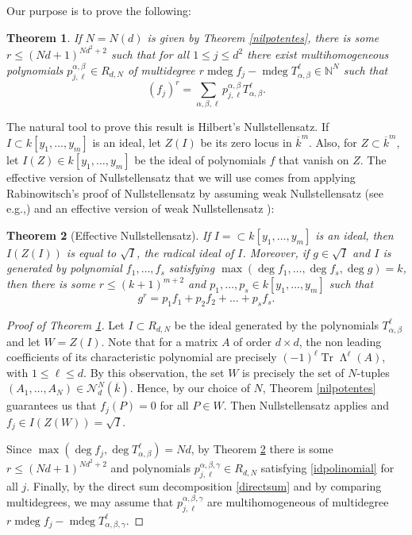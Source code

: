 \documentclass[11pt]{article}
\newcommand{\eg}{e.g.,\xspace}
\let\mathcal\mathscr
\theoremstyle{plain}
\newtheorem{teo}{Theorem}[section]
\theoremstyle{definition}
\newcommand{\NN}{\mathbb{N}}
\DeclareMathOperator{\mdeg}{mdeg}
\DeclareMathOperator{\Tr}{Tr}
\DeclareMathOperator{\Wedge}{\mathsf{\Lambda}}
\begin{document}
Our purpose is to prove the following:
\begin{teo}\label{traduccion}
If $N\!=\!N(d)$ is given by Theorem \ref{nilpotentes}, there is some \hbox{$r\!\leq\!(Nd\!+\!1)^{Nd^2+2}$} such that for all $1\leq j\leq d^2$ there exist multihomogeneous polynomials $p^{\alpha,\beta}_{j,\ell} \in R_{d,N}$ of multidegree $r\mdeg{f_{j}}-\mdeg{T^{\ell}_{\alpha,\beta}}\in {\NN}^{N}$ such that
\begin{equation}\label{idpolinomial}
(f_{j})^{r}=\sum_{\alpha,\beta,\ell}{p^{\alpha,\beta}_{j,\ell}T^{\ell}_{\alpha,\beta}}.
\end{equation}
\end{teo}

The natural tool to prove this result is Hilbert's Nullstellensatz. If $I\subset k[y_1,\dots,y_m]$ is an ideal, let $Z(I)$ be its zero locus in ${\overline{k}}^m$. Also, for $Z\subset \overline{k}^m$, let $I(Z)\in k[y_1,\dots,y_m]$ be the ideal of polynomials $f$ that vanish on $Z$. The effective version of Nullstellensatz that we will use comes from applying Rabinowitsch's proof of Nullstellensatz by assuming weak Nullstellensatz (see \eg \cite[\S 1.7]{fulton}) and an effective version of weak Nullstellensatz \cite{som}):

\begin{teo}[Effective Nullstellensatz]\label{effnul} If $I=\subset k[y_1,\dots,y_m]$ is an ideal, then $I(Z(I))$ is equal to $\sqrt{I}$, the radical ideal of $I$. Moreover, if $g\in \sqrt{I}$ and $I$ is generated by polynomial $f_1,\dots,f_s$ satisfying $\max(\deg{f_1},\dots,\deg{f_s},\deg{g})=k$, then there is some $r\leq (k+1)^{m+2}$ and $p_1,\dots,p_s\in k[y_1,\dots,y_m]$ such that
\begin{equation*}
g^r=p_1f_1+p_2f_2+\dots+p_sf_s.
\end{equation*}
\end{teo}
\begin{proof}[Proof of Theorem \ref{traduccion}]
Let $I\subset R_{d,N}$ be the ideal generated by the polynomials $T_{\alpha,\beta}^{\ell}$ and let $W=Z(I)$.
Note that for a matrix $A$ of order $d\times d$, the non leading coefficients of its characteristic polynomial are precisely $(-1)^{\ell}\Tr{\Wedge^{\ell}(A)}$, with $1\leq \ell \leq d$. By this observation, the set $W$ is precisely the set of $N$-tuples $(A_1,\dots,A_N)\in \mathcal{N}_{d}^{N}(\overline{k})$. Hence, by our choice of $N$, Theorem \ref{nilpotentes} guarantees us that $f_{j}(P)=0$ for all $P\in W$. Then Nullstellensatz applies and $f_{j}\in I(Z(W))=\sqrt{I}$.

Since $\max(\deg{f_j},\deg{T_{\alpha,\beta}^{\ell}})=Nd$, by Theorem \ref{effnul} there is some $r\leq (Nd+1)^{Nd^2+2}$ and polynomials $p_{j,\ell}^{\alpha,\beta,\gamma}\in R_{d,N}$ satisfying \eqref{idpolinomial} for all $j$. Finally, by the direct sum decomposition \eqref{directsum} and by comparing multidegrees, we may assume that $p^{\alpha,\beta,\gamma}_{j,\ell}$ are multihomogeneous of multidegree $r\mdeg{f_{j}}-\mdeg{T^{\ell}_{\alpha,\beta,\gamma}}$.
\end{proof}
\end{document}

